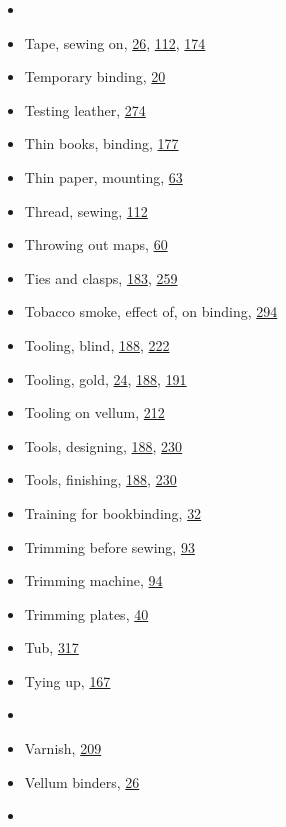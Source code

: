 \documentclass[
]{article}
\begin{document}
\begin{itemize}
\item
  ~
\item
  {Tape}, sewing on, \protect\hyperlink{Page_26}{26},
  \protect\hyperlink{Page_112}{112}, \protect\hyperlink{Page_174}{174}
\item
  Temporary binding, \protect\hyperlink{Page_20}{20}
\item
  Testing leather, \protect\hyperlink{Page_274}{274}
\item
  Thin books, binding, \protect\hyperlink{Page_177}{177}
\item
  Thin paper, mounting, \protect\hyperlink{Page_63}{63}
\item
  Thread, sewing, \protect\hyperlink{Page_112}{112}
\item
  Throwing out maps, \protect\hyperlink{Page_60}{60}
\item
  Ties and clasps, \protect\hyperlink{Page_183}{183},
  \protect\hyperlink{Page_259}{259}
\item
  Tobacco smoke, effect of, on binding,
  \protect\hyperlink{Page_294}{294}
\item
  Tooling, blind, \protect\hyperlink{Page_188}{188},
  \protect\hyperlink{Page_222}{222}
\item
  Tooling, gold, \protect\hyperlink{Page_24}{24},
  \protect\hyperlink{Page_188}{188}, \protect\hyperlink{Page_191}{191}
\item
  Tooling on vellum, \protect\hyperlink{Page_212}{212}
\item
  Tools, designing, \protect\hyperlink{Page_188}{188},
  \protect\hyperlink{Page_230}{230}
\item
  Tools, finishing, \protect\hyperlink{Page_188}{188},
  \protect\hyperlink{Page_230}{230}
\item
  Training for bookbinding, \protect\hyperlink{Page_32}{32}
\item
  Trimming before sewing, \protect\hyperlink{Page_93}{93}
\item
  Trimming machine, \protect\hyperlink{Page_94}{94}
\item
  Trimming plates, \protect\hyperlink{Page_40}{40}
\item
  Tub, \protect\hyperlink{Page_317}{317}
\item
  Tying up, \protect\hyperlink{Page_167}{167}
\item
  ~
\item
  {Varnish}, \protect\hyperlink{Page_209}{209}
\item
  Vellum binders, \protect\hyperlink{Page_26}{26}
\item

\end{itemize}
\end{document}
